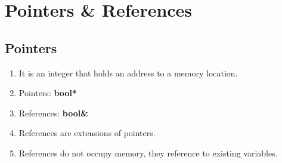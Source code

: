 \documentclass{article}
\begin{document}
        
\section{Pointers \& References}
    \subsection{Pointers}
    
    \begin{enumerate}
        \item It is an integer that holds an address  to a memory location.  
        \item Pointers: \textbf{bool*}
        \item References: \textbf{bool\&}
        \item References are extensions of pointers. 
        \item References do not occupy memory, they reference to existing variables.        
    \end{enumerate}
    
\end{document}
